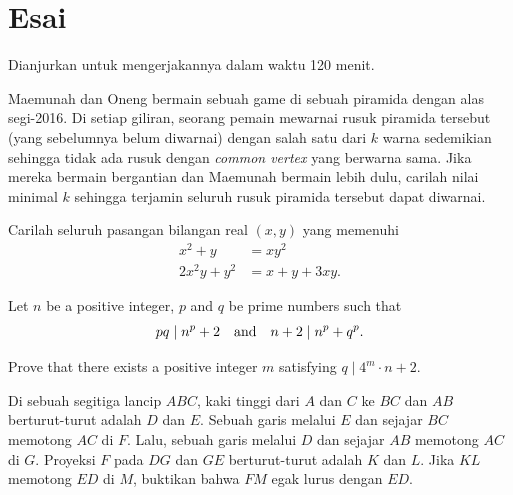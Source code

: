\documentclass[12pt]{scrartcl}
\begin{document}
		
		\newpage
	\section{Esai}
	Dianjurkan untuk mengerjakannya dalam waktu 120 menit.
	
	
	
		
		\begin{soalbaru}
				Maemunah dan Oneng bermain sebuah game di sebuah piramida dengan alas segi-2016. Di setiap giliran, seorang pemain mewarnai rusuk piramida tersebut (yang sebelumnya belum diwarnai) dengan salah satu dari $k$ warna sedemikian sehingga tidak ada rusuk dengan \textit{common vertex} yang berwarna sama. Jika mereka bermain bergantian dan Maemunah bermain lebih dulu, carilah nilai minimal $k$ sehingga terjamin seluruh rusuk piramida tersebut dapat diwarnai.
				
				
			\end{soalbaru}

	\begin{soalbaru}
		Carilah seluruh pasangan bilangan real $(x, y)$ yang memenuhi
		\vspace{-10pt}
		\begin{align*} x^2+y&=xy^2 \\
		2x^2y+y^2&=x+y+3xy. 
		\end{align*}
	\end{soalbaru}

	\begin{soalbaru}
		Let $n$ be a positive integer, $p$ and $q$ be prime numbers such that
		\vspace{-10pt}
		\[ pq \mid n^p+2 \quad \text{and} \quad n+2 \mid n^p+q^p.\\[-12pt] \]
		
		Prove that there exists a positive integer $m$ satisfying $q \mid 4^m \cdot n +2$.
	\end{soalbaru}

	
	\begin{soalbaru}
	Di sebuah segitiga lancip $ABC$, kaki tinggi dari $A$ dan $C$ ke $BC$ dan $AB$ berturut-turut adalah $D$ dan $E$. Sebuah garis melalui $E$ dan sejajar $BC$ memotong $AC$ di $F$. Lalu, sebuah garis melalui $D$ dan sejajar $AB$ memotong $AC$ di $G$. Proyeksi $F$ pada $DG$ dan $GE$ berturut-turut adalah $K$ dan $L$. Jika $KL$ memotong $ED$ di $M$, buktikan bahwa $FM$ egak lurus dengan $ED$.
	\end{soalbaru}


	
\end{document}
